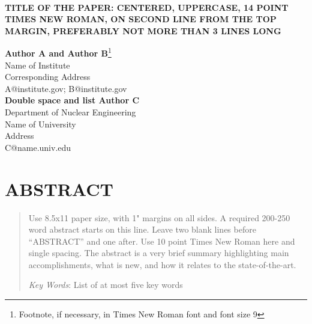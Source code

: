 \documentclass{mc2013}
\begin{document}
\normalsize

\setlength{\baselineskip}{16.8pt}
\vspace{-3pt}

% 
%

\begin{center}
\textbf{\large \\%
TITLE OF THE PAPER: CENTERED, UPPERCASE, 14 POINT TIMES
NEW ROMAN, ON SECOND LINE FROM THE TOP MARGIN,
PREFERABLY NOT MORE THAN 3 LINES LONG 
}

% 
%
\setlength{\baselineskip}{14pt}
\textbf{Author A and Author B}\footnote{Footnote, if necessary, in Times 
  New Roman font and font size 9} \\
Name of Institute  \\
Corresponding Address \\
A@institute.gov; B@institute.gov \\

% 
%
\vspace{12pt}
\textbf{Double space and list Author C}\\
Department of Nuclear Engineering  \\
Name of University \\
Address \\
C@name.univ.edu\\ 
%
%

\end{center}

%
%
\raggedright


\section*{ABSTRACT} 
\begin{quote}
\begin{small}
Use 8.5x11 paper size, with 1" margins on all sides.  A required 200-250 
word abstract starts on this line.  Leave two blank lines before ``ABSTRACT''
and one after.  Use 10 point Times New Roman here and single 
spacing. The abstract is a very brief summary highlighting main 
accomplishments, what is new, and how it relates to the state-of-the-art.

\emph{Key Words}: List of at most five key words
\end{small} 
\end{quote}

\setlength{\baselineskip}{14pt}
\normalsize
\end{document}
